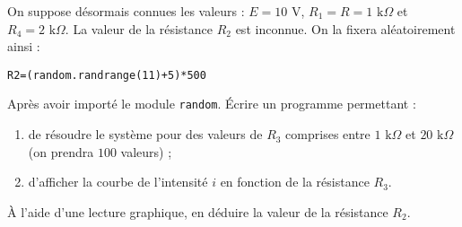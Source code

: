 On suppose désormais connues les valeurs : $E = 10$ V, $R_1 = R = 1 \text{ k} \Omega$ et $R_4= 2 \text{ k} \Omega$. La valeur de la résistance $R_2$ est inconnue. On la fixera aléatoirement ainsi :
		\begin{center}
			\texttt{R2=(random.randrange(11)+5)*500}
		\end{center}
		
\question{} Après avoir importé le module \texttt{random}. \'{E}crire un programme permettant :
				\begin{enumerate}
				\item de résoudre le système pour des valeurs de $R_3$ comprises entre $1\text{ k} \Omega$ et $20\text{ k} \Omega$ (on prendra $100$ valeurs) ;
				\item d'afficher la courbe de l'intensité $i$ en fonction de la résistance $R_3$.
				\end{enumerate}

\question{} \`{A} l'aide d'une lecture graphique, en déduire la valeur de la résistance $R_2$.

